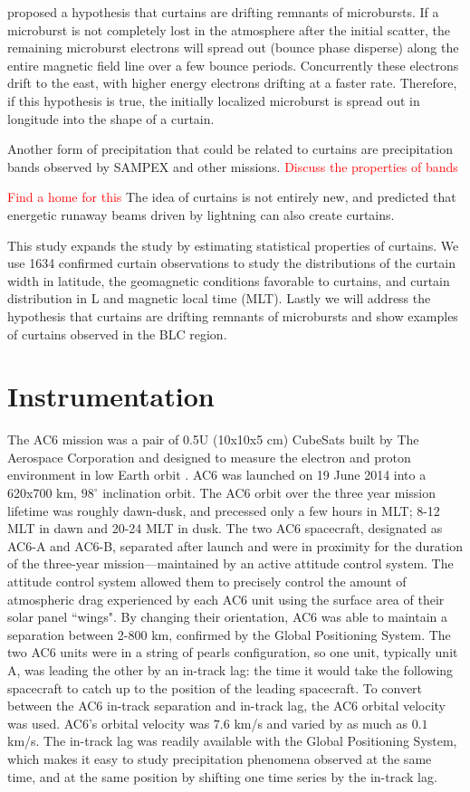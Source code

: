 \documentclass[draft]{agujournal2019}
\begin{document}
 proposed a hypothesis that curtains are drifting remnants of microbursts. If a microburst is not completely lost in the atmosphere after the initial scatter, the remaining microburst electrons will spread out (bounce phase disperse) along the entire magnetic field line over a few bounce periods. Concurrently these electrons drift to the east, with higher energy electrons drifting at a faster rate. Therefore, if this hypothesis is true, the initially localized microburst is spread out in longitude into the shape of a curtain. 

Another form of precipitation that could be related to curtains are precipitation bands observed by SAMPEX and other missions. \textcolor{red}{Discuss the properties of bands} 


\textcolor{red}{Find a home for this} The idea of curtains is not entirely new, and  predicted that energetic runaway beams driven by lightning can also create curtains.

This study expands the  study by estimating statistical properties of curtains. We use 1634 confirmed curtain observations to study the distributions of the curtain width in latitude, the geomagnetic conditions favorable to curtains, and curtain distribution in L and magnetic local time (MLT). Lastly we will address the hypothesis that curtains are drifting remnants of microbursts and show examples of curtains observed in the BLC region.

\section{Instrumentation} \label{instrumentation}
The AC6 mission was a pair of 0.5U (10x10x5 cm) CubeSats built by The Aerospace Corporation and designed to measure the electron and proton environment in low Earth orbit \cite{O'brien2016}. AC6 was launched on 19 June 2014 into a 620x700 km, $98^\circ$ inclination orbit. The AC6 orbit over the three year mission lifetime was roughly dawn-dusk, and precessed only a few hours in MLT; 8-12 MLT in dawn and 20-24 MLT in dusk. The two AC6 spacecraft, designated as AC6-A and AC6-B, separated after launch and were in proximity for the duration of the three-year mission---maintained by an active attitude control system. The attitude control system allowed them to precisely control the amount of atmospheric drag experienced by each AC6 unit using the surface area of their solar panel ``wings". By changing their orientation, AC6 was able to maintain a separation between 2-800 km, confirmed by the Global Positioning System. The two AC6 units were in a string of pearls configuration, so one unit, typically unit A, was leading the other by an in-track lag: the time it would take the following spacecraft to catch up to the position of the leading spacecraft. To convert between the AC6 in-track separation and in-track lag, the AC6 orbital velocity was used. AC6's orbital velocity was $7.6$ km/s and varied by as much as $0.1$ km/s. The in-track lag was readily available with the Global Positioning System, which makes it easy to study precipitation phenomena observed at the same time, and at the same position by shifting one time series by the in-track lag.
\end{document}
